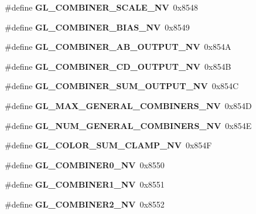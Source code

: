 \begin{DoxyCompactItemize}
\item 
\#define {\bfseries G\+L\+\_\+\+C\+O\+M\+B\+I\+N\+E\+R\+\_\+\+S\+C\+A\+L\+E\+\_\+\+N\+V}~0x8548\label{_s_d_l__opengl_8h_af593ab0f866947ed9f3903835ce7567e}

\item 
\#define {\bfseries G\+L\+\_\+\+C\+O\+M\+B\+I\+N\+E\+R\+\_\+\+B\+I\+A\+S\+\_\+\+N\+V}~0x8549\label{_s_d_l__opengl_8h_ab1d0ee0cfd498a12dedcc4b70e68e287}

\item 
\#define {\bfseries G\+L\+\_\+\+C\+O\+M\+B\+I\+N\+E\+R\+\_\+\+A\+B\+\_\+\+O\+U\+T\+P\+U\+T\+\_\+\+N\+V}~0x854\+A\label{_s_d_l__opengl_8h_a42f6d61992647e0647a8b55b56571568}

\item 
\#define {\bfseries G\+L\+\_\+\+C\+O\+M\+B\+I\+N\+E\+R\+\_\+\+C\+D\+\_\+\+O\+U\+T\+P\+U\+T\+\_\+\+N\+V}~0x854\+B\label{_s_d_l__opengl_8h_aa5c280de129437b502eebc7bb152bbe2}

\item 
\#define {\bfseries G\+L\+\_\+\+C\+O\+M\+B\+I\+N\+E\+R\+\_\+\+S\+U\+M\+\_\+\+O\+U\+T\+P\+U\+T\+\_\+\+N\+V}~0x854\+C\label{_s_d_l__opengl_8h_a7afda3e143a2d4db3c7d542b9103dc5b}

\item 
\#define {\bfseries G\+L\+\_\+\+M\+A\+X\+\_\+\+G\+E\+N\+E\+R\+A\+L\+\_\+\+C\+O\+M\+B\+I\+N\+E\+R\+S\+\_\+\+N\+V}~0x854\+D\label{_s_d_l__opengl_8h_a718e9467103f10c718e8f409030520d0}

\item 
\#define {\bfseries G\+L\+\_\+\+N\+U\+M\+\_\+\+G\+E\+N\+E\+R\+A\+L\+\_\+\+C\+O\+M\+B\+I\+N\+E\+R\+S\+\_\+\+N\+V}~0x854\+E\label{_s_d_l__opengl_8h_a8b833e034f3ea18e82df6b4e5178f50c}

\item 
\#define {\bfseries G\+L\+\_\+\+C\+O\+L\+O\+R\+\_\+\+S\+U\+M\+\_\+\+C\+L\+A\+M\+P\+\_\+\+N\+V}~0x854\+F\label{_s_d_l__opengl_8h_a2f84b9da832d5a69109de6b472cd8bcc}

\item 
\#define {\bfseries G\+L\+\_\+\+C\+O\+M\+B\+I\+N\+E\+R0\+\_\+\+N\+V}~0x8550\label{_s_d_l__opengl_8h_a15ae680c2bbc775cfaa8d522aad22710}

\item 
\#define {\bfseries G\+L\+\_\+\+C\+O\+M\+B\+I\+N\+E\+R1\+\_\+\+N\+V}~0x8551\label{_s_d_l__opengl_8h_a56b5f5a52a6961ff1821af209ac0439a}

\item 
\#define {\bfseries G\+L\+\_\+\+C\+O\+M\+B\+I\+N\+E\+R2\+\_\+\+N\+V}~0x8552\label{_s_d_l__opengl_8h_ad7a406eef71a77c86d2d8da6ef2bb1f8}


\end{DoxyCompactItemize}
